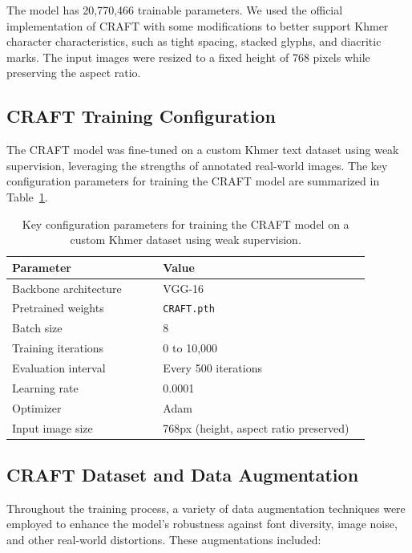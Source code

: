 The model has 20,770,466 trainable parameters. We used the official implementation of CRAFT with some modifications to better support Khmer character characteristics, such as tight spacing, stacked glyphs, and diacritic marks. The input images were resized to a fixed height of 768 pixels while preserving the aspect ratio.

\subsection{CRAFT Training Configuration}
\label{subsec:craft-training-config}

The CRAFT model was fine-tuned on a custom Khmer text dataset using weak supervision, leveraging the strengths of annotated real-world images. The key configuration parameters for training the CRAFT model are summarized in Table~\ref{tab:craft-training-config}.

\begin{table}[H]
\centering
\begin{tabular}{|p{0.4\linewidth}|p{0.55\linewidth}|}
\hline
\textbf{Parameter} & \textbf{Value} \\
\hline
Backbone architecture & VGG-16 \\
Pretrained weights & \texttt{CRAFT.pth} \\
Batch size & 8 \\
Training iterations & 0 to 10,000 \\
Evaluation interval & Every 500 iterations \\
Learning rate & 0.0001 \\
Optimizer & Adam \\
Input image size & 768px (height, aspect ratio preserved) \\
\hline
\end{tabular}
\caption{Key configuration parameters for training the CRAFT model on a custom Khmer dataset 
using weak supervision.}
\label{tab:craft-training-config}
\end{table}

\subsection{CRAFT Dataset and Data Augmentation}
\label{subsec:craft-dataset}

Throughout the training process, a variety of data augmentation techniques were employed to enhance the model's robustness against font diversity, image noise, and other real-world distortions. These augmentations included:

